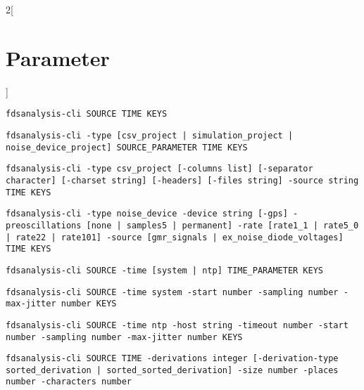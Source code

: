 \begin{multicols*}{2}[\chapter{Parameter}]

\end{multicols*}

\begin{lstlisting}[style=synopsis,label={lst:fdsanalysis_cli_overview},caption={Zusammenfassung}]
fdsanalysis-cli SOURCE TIME KEYS
\end{lstlisting}

\begin{lstlisting}[style=synopsis,label={lst:fdsanalysis_cli_source},caption={SOURCE Parameter}]
fdsanalysis-cli -type [csv_project | simulation_project | noise_device_project] SOURCE_PARAMETER TIME KEYS
\end{lstlisting}

\begin{lstlisting}[style=synopsis,label={lst:fdsanalysis_cli_csv},caption={SOURCE\_PARAMETER Parameter wenn Quelle ist CSV}]
fdsanalysis-cli -type csv_project [-columns list] [-separator character] [-charset string] [-headers] [-files string] -source string TIME KEYS
\end{lstlisting}

\begin{lstlisting}[style=synopsis,label={lst:fdsanalysis_cli_noise_device},caption={SOURCE\_PARAMETER Parameter wenn Quelle ist NOISE\_DEVICE}]
fdsanalysis-cli -type noise_device -device string [-gps] -preoscillations [none | samples5 | permanent] -rate [rate1_1 | rate5_0 | rate22 | rate101] -source [gmr_signals | ex_noise_diode_voltages] TIME KEYS
\end{lstlisting}

\begin{lstlisting}[style=synopsis,label={lst:fdsanalysis_cli_keys},caption={TIME Parameter}]
fdsanalysis-cli SOURCE -time [system | ntp] TIME_PARAMETER KEYS
\end{lstlisting}

\begin{lstlisting}[style=synopsis,label={lst:fdsanalysis_cli_noise_device},caption={TIME\_PARAMETER  Parameter wenn Zeitquelle ist SYSTEM}]
fdsanalysis-cli SOURCE -time system -start number -sampling number -max-jitter number KEYS
\end{lstlisting}

\begin{lstlisting}[style=synopsis,label={lst:fdsanalysis_cli_noise_device},caption={TIME\_PARAMETER  Parameter wenn Zeitquelle ist NTP}]
fdsanalysis-cli SOURCE -time ntp -host string -timeout number -start number -sampling number -max-jitter number KEYS
\end{lstlisting}

\begin{lstlisting}[style=synopsis,label={lst:fdsanalysis_cli_keys},caption={KEYS Parameter}]
fdsanalysis-cli SOURCE TIME -derivations integer [-derivation-type sorted_derivation | sorted_sorted_derivation] -size number -places number -characters number
\end{lstlisting}

